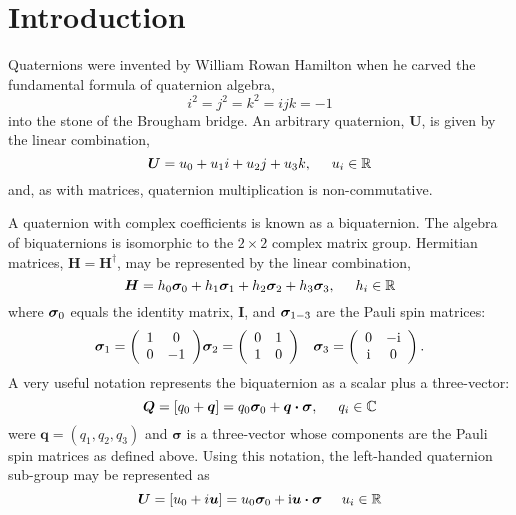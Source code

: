\documentclass[12pt]{article}
\newcommand{\Ci}{{\rm i}}
\newcommand{\C}{\mathbb{C}}
\newcommand{\R}{\mathbb{R}}
\newcommand{\pauli}[1]{\ensuremath{ {\bm\sigma}_{\rm #1} }}
\begin{document}
\section{Introduction}

Quaternions were invented by William Rowan Hamilton when he carved the
fundamental formula of quaternion algebra,
\begin{equation}
i^2=j^2=k^2=ijk=-1
\end{equation}
into the stone of the Brougham bridge.
An arbitrary quaternion, $\bm{U}$, is given by the linear combination,
\begin{equation}
\bm{U}=u_0+u_1i+u_2j+u_3k, \hspace{5mm} u_i\in\R
\end{equation}
and, as with matrices, quaternion multiplication is non-commutative.

A quaternion with complex coefficients is known as a biquaternion.
The algebra of biquaternions is isomorphic to the $2\times2$ complex
matrix group.  Hermitian matrices, $\bm{H}=\bm{H}^\dagger$, may be
represented by the linear combination,
\begin{equation}
\bm{H}=h_0\pauli{0}+h_1\pauli{1}+h_2\pauli{2}+h_3\pauli{3},\hspace{5mm}h_i\in\R
\end{equation}
where $\pauli{0}$ equals the identity matrix, $\bm{I}$, and $\pauli{1-3}$
are the Pauli spin matrices:
\begin{eqnarray}
\pauli{1} = \left( \begin{array}{cc}
1 & 0 \\
0 & -1 
\end{array}\right)
&
\pauli{2} = \left( \begin{array}{cc}
0 & 1 \\
1 & 0 
\end{array}\right)
& 
\pauli{3} = \left( \begin{array}{cc}
0 & -\Ci \\
\Ci & 0
\end{array}\right).
\label{eqn:pauli}
\end{eqnarray}
A very useful notation represents the biquaternion as a scalar plus
a three-vector:
\begin{equation}\label{eqn:biquaternion}
\bm{Q}=[q_0+\bm{q}] = q_0\pauli{0} + \bm{q\cdot\sigma}, \hspace{5mm} q_i\in\C
\end{equation}
were $\bm{q}=(q_1,q_2,q_3)$ and $\bm\sigma$ is a three-vector whose
components are the Pauli spin matrices as defined above.  Using this
notation, the left-handed quaternion sub-group may be represented as
\begin{equation}\label{eqn:quaternion}
\bm{U}=[u_0+i\bm{u}]= u_0\pauli{0} + \Ci\bm{u\cdot\sigma} \hspace{5mm} u_i\in\R
\end{equation}
\end{document}
